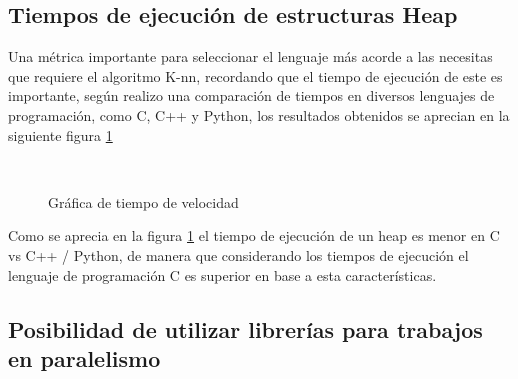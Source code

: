 \subsection*{Tiempos de ejecución de estructuras Heap} 

Una métrica importante para seleccionar el lenguaje más acorde a las necesitas que requiere el algoritmo K-nn, recordando que el tiempo de ejecución de este es importante, según \cite{heap} realizo una comparación de tiempos en diversos lenguajes de programación, como C, C++ y Python, los resultados obtenidos se aprecian en la siguiente figura \ref{speedheap}

\begin{figure}
\begin{center}
~~~~~~~~~~~~
\caption{\label{speedheap} Gráfica de tiempo de velocidad}
\end{center}
\end{figure}

Como se aprecia en la figura \ref{speedheap} el tiempo de ejecución de un heap es menor en C vs C++ / Python, de manera que considerando los tiempos de ejecución el lenguaje de programación C es superior en base a esta características. 

\subsection*{Posibilidad de utilizar librerías para trabajos en paralelismo}

